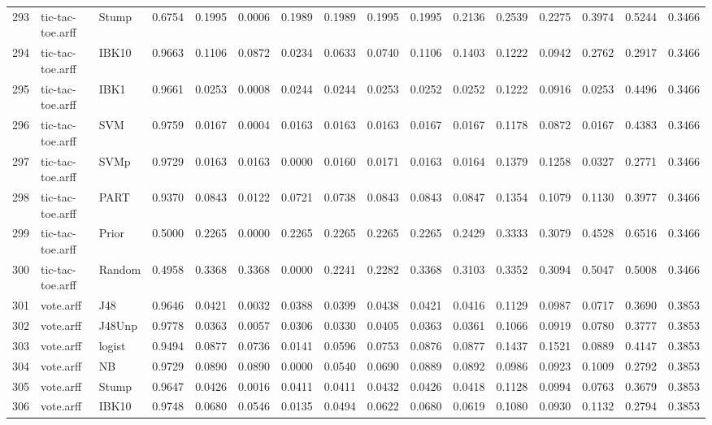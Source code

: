 \documentclass {article}
\begin{document}
\begin{table}[ht]
\begin{tabular}{rllrrrrrrrrrrrrr}
  293 & tic-tac-toe.arff & Stump & 0.6754 & 0.1995 & 0.0006 & 0.1989 & 0.1989 & 0.1995 & 0.1995 & 0.2136 & 0.2539 & 0.2275 & 0.3974 & 0.5244 & 0.3466 \\ 
  294 & tic-tac-toe.arff & IBK10 & 0.9663 & 0.1106 & 0.0872 & 0.0234 & 0.0633 & 0.0740 & 0.1106 & 0.1403 & 0.1222 & 0.0942 & 0.2762 & 0.2917 & 0.3466 \\ 
  295 & tic-tac-toe.arff & IBK1 & 0.9661 & 0.0253 & 0.0008 & 0.0244 & 0.0244 & 0.0253 & 0.0252 & 0.0252 & 0.1222 & 0.0916 & 0.0253 & 0.4496 & 0.3466 \\ 
  296 & tic-tac-toe.arff & SVM & 0.9759 & 0.0167 & 0.0004 & 0.0163 & 0.0163 & 0.0163 & 0.0167 & 0.0167 & 0.1178 & 0.0872 & 0.0167 & 0.4383 & 0.3466 \\ 
  297 & tic-tac-toe.arff & SVMp & 0.9729 & 0.0163 & 0.0163 & 0.0000 & 0.0160 & 0.0171 & 0.0163 & 0.0164 & 0.1379 & 0.1258 & 0.0327 & 0.2771 & 0.3466 \\ 
  298 & tic-tac-toe.arff & PART & 0.9370 & 0.0843 & 0.0122 & 0.0721 & 0.0738 & 0.0843 & 0.0843 & 0.0847 & 0.1354 & 0.1079 & 0.1130 & 0.3977 & 0.3466 \\ 
  299 & tic-tac-toe.arff & Prior & 0.5000 & 0.2265 & 0.0000 & 0.2265 & 0.2265 & 0.2265 & 0.2265 & 0.2429 & 0.3333 & 0.3079 & 0.4528 & 0.6516 & 0.3466 \\ 
  300 & tic-tac-toe.arff & Random & 0.4958 & 0.3368 & 0.3368 & 0.0000 & 0.2241 & 0.2282 & 0.3368 & 0.3103 & 0.3352 & 0.3094 & 0.5047 & 0.5008 & 0.3466 \\ 
  301 & vote.arff & J48 & 0.9646 & 0.0421 & 0.0032 & 0.0388 & 0.0399 & 0.0438 & 0.0421 & 0.0416 & 0.1129 & 0.0987 & 0.0717 & 0.3690 & 0.3853 \\ 
  302 & vote.arff & J48Unp & 0.9778 & 0.0363 & 0.0057 & 0.0306 & 0.0330 & 0.0405 & 0.0363 & 0.0361 & 0.1066 & 0.0919 & 0.0780 & 0.3777 & 0.3853 \\ 
  303 & vote.arff & logist & 0.9494 & 0.0877 & 0.0736 & 0.0141 & 0.0596 & 0.0753 & 0.0876 & 0.0877 & 0.1437 & 0.1521 & 0.0889 & 0.4147 & 0.3853 \\ 
  304 & vote.arff & NB & 0.9729 & 0.0890 & 0.0890 & 0.0000 & 0.0540 & 0.0690 & 0.0889 & 0.0892 & 0.0986 & 0.0923 & 0.1009 & 0.2792 & 0.3853 \\ 
  305 & vote.arff & Stump & 0.9647 & 0.0426 & 0.0016 & 0.0411 & 0.0411 & 0.0432 & 0.0426 & 0.0418 & 0.1128 & 0.0994 & 0.0763 & 0.3679 & 0.3853 \\ 
  306 & vote.arff & IBK10 & 0.9748 & 0.0680 & 0.0546 & 0.0135 & 0.0494 & 0.0622 & 0.0680 & 0.0619 & 0.1080 & 0.0930 & 0.1132 & 0.2794 & 0.3853 \\ 

\end{tabular}
\end{table}
\end{document}
